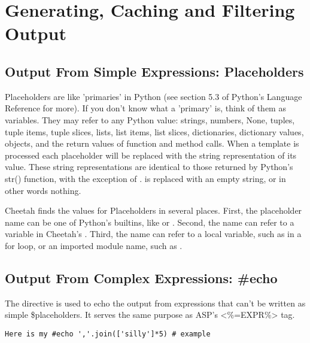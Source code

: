 \section{Generating, Caching and Filtering Output}
\label{output}

\subsection{Output From Simple Expressions: Placeholders}
\label{output.placeholders}

Placeholders are like 'primaries' in Python (see section 5.3 of Python's
Language Reference for more). If you don't know what a 'primary' is, think of
them as variables. They may refer to any Python value: strings, numbers, None,
tuples, tuple items, tuple slices, lists, list items, list slices, dictionaries,
dictionary values, objects, and the return values of function and method calls.
When a template is processed each placeholder will be replaced with the string
representation of its value.  These string representations are identical to
those returned by Python's str() function, with the exception of .
 is replaced with an empty string, or in other words nothing.

Cheetah finds the values for Placeholders in several places.  First, the
placeholder name can be one of Python's builtins, like  or
.  Second, the name can refer to a variable in Cheetah's
.  Third, the name can refer to a local variable, such as
 in a for loop, or an imported module name, such as .

\subsection{Output From Complex Expressions: \#echo}
\label{output.echo}

The  directive is used to echo the output from expressions that
can't be written as simple \$placeholders.  It serves the same purpose as ASP's
<\%=EXPR\%> tag.

\begin{verbatim}
Here is my #echo ','.join(['silly']*5) # example 
\end{verbatim}

